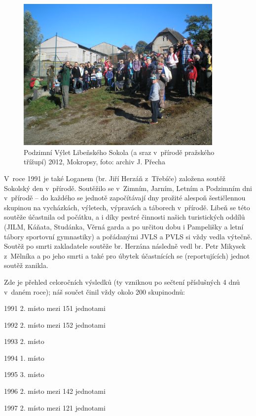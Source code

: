 \documentclass[a5paper, 11pt, twoside]{article}
\begin{document}
\begin{figure}[h!]
  \centering 
  \includegraphics[width=0.9\textwidth]{img/39_pvls.JPG}
  \caption*{Podzimní Výlet Libeňského Sokola (a sraz v~přírodě pražského
  třížupí) 2012, Mokropsy, foto: archiv J. Přecha}
\end{figure}

V~roce 1991 je také Loganem (br. Jiří Herzáň z~Třebíče) založena soutěž
Sokolský den v~přírodě. Soutěžilo se v~Zimním, Jarním, Letním a
Podzimním dni v~přírodě -- do každého se jednotě započítávají dny
prožité alespoň šestičlennou skupinou na vycházkách, výletech, výpravách
a táborech v~přírodě. Libeň se této soutěže účastnila od počátku, a i
díky pestré činnosti našich turistických oddílů (JILM, Káňata, Studánka,
Věrná garda a po určitou dobu i Pampelišky a letní tábory sportovní
gymnastiky) a pořádanými JVLS a PVLS si vždy vedla výtečně. Soutěž po
smrti zakladatele soutěže br. Herzána následně vedl br. Petr Mikysek
z~Mělníka a po jeho smrti a také pro úbytek účastnících se (reportujících)
jednot soutěž zanikla.

Zde je přehled celoročních výsledků (ty vzniknou po sečtení příslušných
4 dnů v~daném roce); náš součet činil vždy okolo 200 skupinodnů:

1991 2. místo mezi 151 jednotami

1992 2. místo mezi 152 jednotami

1993 2. místo

1994 1. místo

1995 3. místo

1996 2. místo mezi 142 jednotami

1997 2. místo mezi 121 jednotami
\end{document}
